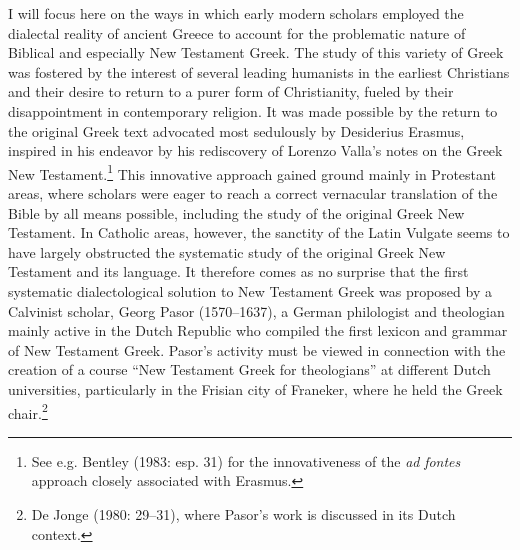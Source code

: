 I will focus here on the ways in which early modern scholars employed the dialectal reality of ancient Greece to account for the problematic nature of Biblical and especially New Testament Greek. The study of this variety of Greek was fostered by the interest of several leading humanists in the earliest Christians and their desire to return to a purer form of Christianity, fueled by their disappointment in contemporary religion. It was made possible by the return to the original Greek text advocated most sedulously by Desiderius Erasmus, inspired in his endeavor by his rediscovery of Lorenzo Valla’s notes on the Greek New Testament.\footnote{See e.g. Bentley (1983: esp. 31) for the innovativeness of the \textit{ad} \textit{fontes} approach closely associated with Erasmus.} This innovative approach gained ground mainly in Protestant areas, where scholars were eager to reach a correct vernacular translation of the Bible by all means possible, including the study of the original Greek New Testament. In Catholic areas, however, the sanctity of the Latin Vulgate seems to have largely obstructed the systematic study of the original Greek New Testament and its language. It therefore comes as no surprise that the first systematic dialectological solution to New Testament Greek was proposed by a Calvinist scholar, Georg Pasor (1570–1637), a German philologist and theologian mainly active in the Dutch Republic who compiled the first lexicon and grammar of New Testament Greek. Pasor’s activity must be viewed in connection with the creation of a course “New Testament Greek for theologians” at different Dutch universities, particularly in the Frisian city of Franeker, where he held the Greek chair.\footnote{De Jonge (1980: 29–31), where Pasor’s work is discussed in its Dutch context.}

